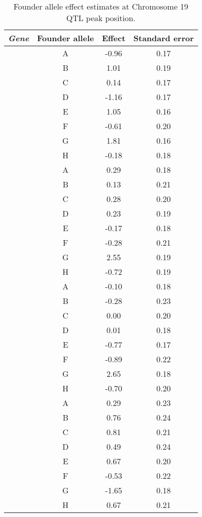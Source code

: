 \documentclass[oneside]{book}
\begin{document}
\begin{table}[ht]
\caption{Founder allele effect estimates at Chromosome 19 QTL peak position.}\label{tab:effects}
\centering
\begin{tabular}{>{\em}cccc}
  \hline
 Gene & Founder allele & Effect & Standard error \\
  \hline
\multirow{8}{*}{Asah2} & A & -0.96 & 0.17 \\
  & B & 1.01 & 0.19 \\
  & C & 0.14 & 0.17 \\
  & D & -1.16 & 0.17 \\
  & E & 1.05 & 0.16 \\
  & F & -0.61 & 0.20 \\
  & G & 1.81 & 0.16 \\
  & H & -0.18 & 0.18 \\
  \hline
  \multirow{8}{*}{Lipo1} & A & 0.29 & 0.18 \\
  & B & 0.13 & 0.21 \\
  & C & 0.28 & 0.20 \\
  & D & 0.23 & 0.19 \\
  & E & -0.17 & 0.18 \\
  & F & -0.28 & 0.21 \\
  & G & 2.55 & 0.19 \\
  & H & -0.72 & 0.19 \\
  \hline
\multirow{8}{*}{Lipo2} & A & -0.10 & 0.18 \\
  & B & -0.28 & 0.23 \\
  & C & 0.00 & 0.20 \\
  & D & 0.01 & 0.18 \\
  & E & -0.77 & 0.17 \\
  & F & -0.89 & 0.22 \\
  & G & 2.65 & 0.18 \\
  & H & -0.70 & 0.20 \\
   \hline
\multirow{8}{*}{4933413C19Rik} & A & 0.29 & 0.23 \\
  & B & 0.76 & 0.24 \\
  & C & 0.81 & 0.21 \\
  & D & 0.49 & 0.24 \\
  & E & 0.67 & 0.20 \\
  & F & -0.53 & 0.22 \\
  & G & -1.65 & 0.18 \\
  & H & 0.67 & 0.21 \\
   \hline
\end{tabular}
\end{table}
\end{document}
